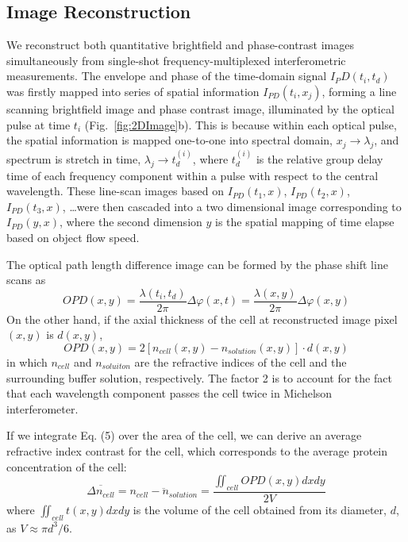 \documentclass[aps,pra,reprint,superscriptaddress]{revtex4-1}
\begin{document}
\subsection{Image Reconstruction}

We reconstruct both quantitative brightfield and phase-contrast images simultaneously from single-shot frequency-multiplexed interferometric measurements. The envelope and phase of the time-domain signal $I_PD (t_i,t_d)$ was firstly mapped into series of spatial information $I_{PD}(t_i,x_j)$, forming a line scanning brightfield image and phase contrast image, illuminated by the optical pulse at time $t_i$ (Fig.~\ref{fig:2DImage}b). This is because within each optical pulse, the spatial information is mapped one-to-one into spectral domain, $x_j \rightarrow \lambda_j$, and spectrum is stretch in time, $\lambda_j \rightarrow t_d^{(i)}$, where $t_d^{(i)}$ is the relative group delay time of each frequency component within a pulse with respect to the central wavelength. These line-scan images based on $I_{PD}(t_1,x)$, $I_{PD} (t_2,x)$, $I_{PD} (t_3,x)$, \ldots were then cascaded into a two dimensional image corresponding to $I_{PD}(y,x)$, where the second dimension $y$ is the spatial mapping of time elapse based on object flow speed. 

The optical path length difference image can be formed by the phase shift line scans as
\begin{equation}
OPD(x,y) = \frac{\lambda(t_i,t_d)}{2\pi} \Delta\varphi(x,t) = \frac{\lambda(x,y)}{2π} \Delta\varphi(x,y)
\end{equation}
On the other hand, if the axial thickness of the cell at reconstructed image pixel $(x,y)$ is $d(x,y)$,
\begin{equation}
OPD(x,y) = 2 [n_{cell}(x,y) - n_{solution}(x,y)] \cdot d(x,y)
\end{equation}
in which $n_{cell}$ and $n_{soluiton}$ are the refractive indices of the cell and the surrounding buffer solution, respectively. The factor 2 is to account for the fact that each wavelength component passes the cell twice in Michelson interferometer. 

If we integrate Eq. (5) over the area of the cell, we can derive an average refractive index contrast for the cell, which corresponds to the average protein concentration of the cell:
\begin{equation}
\overline{\Delta n_{cell}} = \overline{n_{cell} - n_{solution}} = \frac{\iint_{cell} OPD(x,y) dx dy}{2 V}
\end{equation}
where $\iint_{cell} t(x,y) dx dy$ is the volume of the cell obtained from its diameter, $d$, as $V \approx \pi d^3/6$. 
\end{document}
